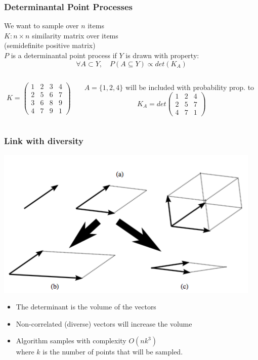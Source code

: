 \documentclass[handout]{beamer}
\begin{document}
\begin{frame}
    \frametitle{Determinantal Point Processes}
    We want to sample over $n$ items\\
    $K : n \times n$ \alert{similarity matrix} over items\\(semidefinite positive matrix)\\
    $P$ is a \alert{determinantal point process} if $Y$ is drawn with property:
    \[ \forall A \subset Y, \quad P(A \subseteq Y) \propto det(K_A) \]
    \begin{example}
    \begin{columns}
    \begin{column}{0.5\textwidth}
    \[ K = \left(\begin{array}{cccc}
    1 & 2 & 3 & 4\\
    2 & 5 & 6 & 7\\
    3 & 6 & 8 & 9\\
    4 & 7 & 9 & 1
    \end{array}\right) \]
    \end{column}
    \begin{column}{0.5\textwidth}
    $A = \{1, 2, 4\}$ will be included with probability prop. to
    \[ K_A = det\left(\begin{array}{ccc}
    1 & 2 & 4\\
    2 & 5 & 7\\
    4 & 7 & 1
    \end{array}\right) \]
    \end{column}
    \end{columns}
    \end{example}
\end{frame}

\begin{frame}
    \frametitle{Link with diversity}
    \centering
    \includegraphics[width=0.7\linewidth]{figures/vol.png}
    \begin{itemize}
    \item The determinant is the volume of the vectors
    \item Non-correlated (\alert{diverse}) vectors will increase the volume
    \end{itemize}
    \begin{itemize}
    \item Algorithm samples with complexity $O(nk^3)$\\where $k$ is the number of points that will be sampled.
    \end{itemize}
\end{frame}
\end{document}
